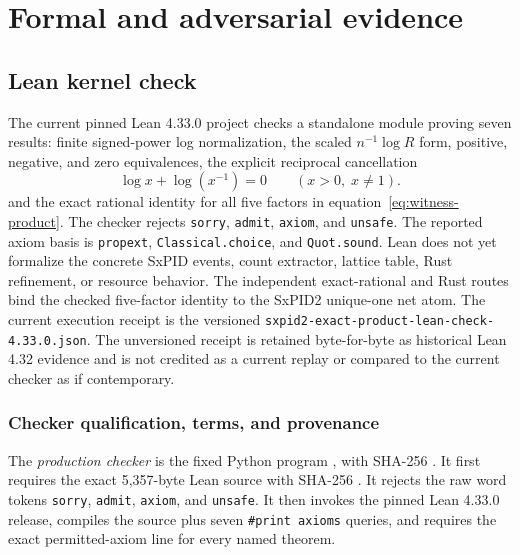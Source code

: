 \documentclass[11pt]{article}
\theoremstyle{definition}
\begin{document}
\section{Formal and adversarial evidence}

\subsection{Lean kernel check}

The current pinned Lean 4.33.0 project checks a standalone module proving seven results: finite signed-power log normalization,
the scaled \(n^{-1}\log R\) form, positive, negative, and zero equivalences, the explicit
reciprocal cancellation
\begin{equation}\label{eq:reciprocal-cancel}
\log x+\log(x^{-1})=0\qquad(x>0,\;x\ne1).
\end{equation}
and the exact rational identity for all five factors in equation~\eqref{eq:witness-product}.
The checker rejects \texttt{sorry}, \texttt{admit}, \texttt{axiom}, and \texttt{unsafe}.  The
reported axiom basis is \texttt{propext}, \texttt{Classical.choice}, and \texttt{Quot.sound}.  Lean
does not yet formalize the concrete SxPID events, count extractor, lattice table, Rust refinement,
or resource behavior.  The independent exact-rational and Rust routes bind the checked five-factor
identity to the SxPID2 unique-one net atom.
The current execution receipt is the versioned
\texttt{sxpid2-exact-product-lean-check-4.33.0.json}.  The unversioned receipt is retained
byte-for-byte as historical Lean 4.32 evidence and is not credited as a current replay or compared
to the current checker as if contemporary.

\subsubsection{Checker qualification, terms, and provenance}

The \emph{production checker} is the fixed Python program
, with SHA-256
.
It first requires the exact 5,357-byte Lean source with SHA-256
.
It rejects the raw word tokens \texttt{sorry}, \texttt{admit}, \texttt{axiom}, and
\texttt{unsafe}.  It then invokes the pinned Lean 4.33.0 release, compiles the source plus seven
\texttt{\#print axioms} queries, and requires the exact permitted-axiom line for every named
theorem.
\end{document}
